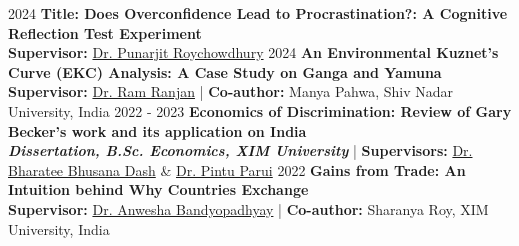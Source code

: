 \datedsubsection{ }
	{%
		2024}
	{%
		\textbf{Title: Does Overconfidence Lead to Procrastination?: A Cognitive Reflection Test Experiment}
    } \\
    \textbf{Supervisor:} \href{https://punarjitroyc.weebly.com}{Dr. Punarjit Roychowdhury}
\vspace{-0.8em}
\datedsubsection{ }
	{%
		2024}
	{%
		\textbf{An Environmental Kuznet’s Curve (EKC) Analysis: A Case Study on Ganga and Yamuna }
    } \\
    \textbf{Supervisor:} \href{https://snu.edu.in/faculty/ram-ranjan/}{Dr. Ram Ranjan} | \textbf{Co-author:} Manya Pahwa, Shiv Nadar University, India
\vspace{-0.8em}
\datedsubsection{ }
	{%
		2022 - 2023}
	{%
		\textbf{Economics of Discrimination: Review of Gary Becker’s work and its application on India}
    } \\
    \textbf{\textit{Dissertation, B.Sc. Economics, XIM University}} |
    \textbf{Supervisors:} \href{http://jnu.ac.in/content/bharateedash}{Dr. Bharatee Bhusana Dash} \& \href{https://www.economics.iitb.ac.in/pintu.html}{Dr. Pintu Parui}
\vspace{-0.8em}
\datedsubsection{ }
	{%
		2022}
	{%
		\textbf{Gains from Trade: An Intuition behind Why Countries Exchange}
    } \\
    \textbf{Supervisor:} \href{https://sites.google.com/view/anweshabandyopadhyay/home}{Dr. Anwesha Bandyopadhyay}  | \textbf{Co-author:} Sharanya Roy, XIM University, India
    
